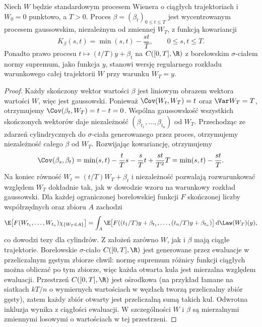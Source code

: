 \begin{twierdzenie}
Niech $W$ będzie standardowym procesem Wienera
o ciągłych trajektoriach i $W_0=0$ punktowo, a $T>0$.
Proces $\beta=(\beta_t)_{0\le t\le T}$ jest wycentrowanym
procesem gaussowskim, niezależnym od zmiennej $W_T$,
z funkcją kowariancji
\[
K_\beta(s,t)=\min(s,t)-\frac{st}{T},
\qquad 0\le s,t\le T.
\]
Ponadto prawo procesu $t\mapsto (t/T)y+\beta_t$
na $C([0,T],\R)$ z borelowskim $\sigma$-ciałem
normy supremum, jako funkcja $y$, stanowi wersję
regularnego rozkładu warunkowego całej trajektorii $W$
przy warunku $W_T=y$.
\end{twierdzenie}
\begin{proof}
Każdy skończony wektor wartości $\beta$ jest liniowym obrazem
wektora wartości $W$, więc jest gaussowski.
Ponieważ $\Cov(W_t,W_T)=t$ oraz $\Var W_T=T$,
otrzymujemy $\Cov(\beta_t,W_T)=t-t=0$.
Wspólna gaussowskość wszystkich skończonych wektorów daje
niezależność $(\beta_{t_1},\ldots,\beta_{t_n})$ od $W_T$.
Przechodząc ze zdarzeń cylindrycznych do $\sigma$-ciała generowanego
przez proces, otrzymujemy niezależność całego $\beta$ od $W_T$.
Rozwijając kowariancję, otrzymujemy
\[
\Cov(\beta_s,\beta_t)=\min(s,t)
-\frac{t}{T}s-\frac{s}{T}t+\frac{st}{T^2}T
=\min(s,t)-\frac{st}{T}.
\]
Na koniec równość $W_t=(t/T)W_T+\beta_t$ i niezależność
pozwalają rozwarunkować względem $W_T$ dokładnie tak,
jak w dowodzie wzoru na warunkowy rozkład gaussowski.
Dla każdej ograniczonej borelowskiej funkcji $F$ skończonej
liczby współrzędnych oraz zbioru $A$ zachodzi
\[
\E\bigl[F(W_{t_1},\ldots,W_{t_n})\chi_{\{W_T\in A\}}\bigr]
=\int_A \E\bigl[F((t_1/T)y+\beta_{t_1},\ldots,
(t_n/T)y+\beta_{t_n})\bigr]\,\mathrm d\Law(W_T)(y),
\]
co dowodzi tezy dla cylindrów. Z założeń zarówno $W$,
jak i $\beta$ mają ciągłe trajektorie.
Borelowskie $\sigma$-ciało $C([0,T],\R)$ jest generowane
przez ewaluacje w przeliczalnym gęstym zbiorze chwil:
normę supremum różnicy funkcji ciągłych można obliczać
po tym zbiorze, więc każda otwarta kula jest mierzalna
względem ewaluacji. Przestrzeń $C([0,T],\R)$ jest
ośrodkowa (na przykład łamane na siatkach
$kT/n$ o wymiernych wartościach w węzłach tworzą
przeliczalny zbiór gęsty), zatem każdy zbiór otwarty
jest przeliczalną sumą takich kul. Odwrotna inkluzja
wynika z ciągłości ewaluacji. W szczególności $W$
i $\beta$ są mierzalnymi zmiennymi losowymi
o wartościach w tej przestrzeni.


\end{proof}
